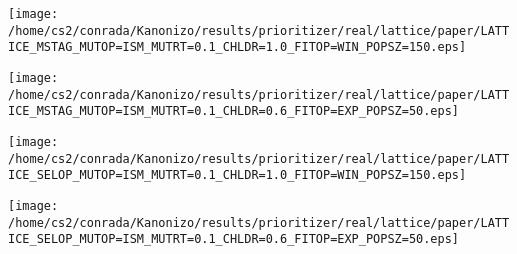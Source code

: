 \documentclass{article}
\begin{document}
\begin{center}
\vspace*{-1.7in}
\hspace*{-3.9in}
\texttt{[image: /home/cs2/conrada/Kanonizo/results/prioritizer/real/lattice/paper/LATTICE\_MSTAG\_MUTOP=ISM\_MUTRT=0.1\_CHLDR=1.0\_FITOP=WIN\_POPSZ=150.eps]} \newpage
\end{center}

\begin{center}
\vspace*{-1.7in}
\hspace*{-3.9in}
\texttt{[image: /home/cs2/conrada/Kanonizo/results/prioritizer/real/lattice/paper/LATTICE\_MSTAG\_MUTOP=ISM\_MUTRT=0.1\_CHLDR=0.6\_FITOP=EXP\_POPSZ=50.eps]} \newpage
\end{center}

\begin{center}
\vspace*{-1.7in}
\hspace*{-3.9in}
\texttt{[image: /home/cs2/conrada/Kanonizo/results/prioritizer/real/lattice/paper/LATTICE\_SELOP\_MUTOP=ISM\_MUTRT=0.1\_CHLDR=1.0\_FITOP=WIN\_POPSZ=150.eps]} \newpage
\end{center}

\begin{center}
\vspace*{-1.7in}
\hspace*{-3.9in}
\texttt{[image: /home/cs2/conrada/Kanonizo/results/prioritizer/real/lattice/paper/LATTICE\_SELOP\_MUTOP=ISM\_MUTRT=0.1\_CHLDR=0.6\_FITOP=EXP\_POPSZ=50.eps]} \newpage
\end{center}
\end{document}
